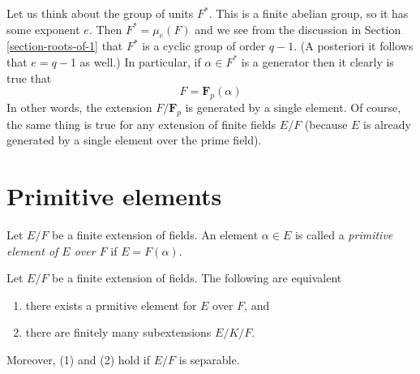 \medskip\noindent
Let us think about the group of units $F^*$. This is a finite abelian
group, so it has some exponent $e$. Then $F^* = \mu_e(F)$ and we see
from the discussion in Section \ref{section-roots-of-1} that $F^*$
is a cyclic group of order $q - 1$. (A posteriori it follows that
$e = q - 1$ as well.) In particular, if $\alpha \in F^*$ is a generator
then it clearly is true that
$$
F = \mathbf{F}_p(\alpha)
$$
In other words, the extension $F/\mathbf{F}_p$ is generated by a single
element. Of course, the same thing is true for any extension of finite
fields $E/F$ (because $E$ is already generated by a single element over
the prime field).





\section{Primitive elements}
\label{section-primitive-element}

\noindent
Let $E/F$ be a finite extension of fields. An element $\alpha \in E$
is called a {\it primitive element of $E$ over $F$} if $E = F(\alpha)$.

\begin{lemma}
\label{lemma-primitive-element}
Let $E/F$ be a finite extension of fields. The following are equivalent
\begin{enumerate}
\item there exists a prmitive element for $E$ over $F$, and
\item there are finitely many subextensions $E/K/F$.
\end{enumerate}
Moreover, (1) and (2) hold if $E/F$ is separable.
\end{lemma}

